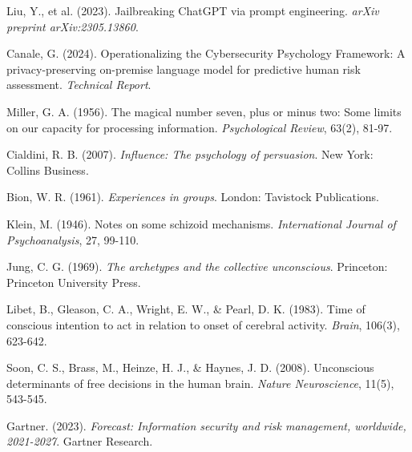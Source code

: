 \documentclass[11pt, a4paper]{article}
\begin{document}
\begin{thebibliography}{99}
Liu, Y., et al. (2023). Jailbreaking ChatGPT via prompt engineering. \textit{arXiv preprint arXiv:2305.13860}.

Canale, G. (2024). Operationalizing the Cybersecurity Psychology Framework: A privacy-preserving on-premise language model for predictive human risk assessment. \textit{Technical Report}.

Miller, G. A. (1956). The magical number seven, plus or minus two: Some limits on our capacity for processing information. \textit{Psychological Review}, 63(2), 81-97.

Cialdini, R. B. (2007). \textit{Influence: The psychology of persuasion}. New York: Collins Business.

Bion, W. R. (1961). \textit{Experiences in groups}. London: Tavistock Publications.

Klein, M. (1946). Notes on some schizoid mechanisms. \textit{International Journal of Psychoanalysis}, 27, 99-110.

Jung, C. G. (1969). \textit{The archetypes and the collective unconscious}. Princeton: Princeton University Press.

Libet, B., Gleason, C. A., Wright, E. W., \& Pearl, D. K. (1983). Time of conscious intention to act in relation to onset of cerebral activity. \textit{Brain}, 106(3), 623-642.

Soon, C. S., Brass, M., Heinze, H. J., \& Haynes, J. D. (2008). Unconscious determinants of free decisions in the human brain. \textit{Nature Neuroscience}, 11(5), 543-545.

Gartner. (2023). \textit{Forecast: Information security and risk management, worldwide, 2021-2027}. Gartner Research.

\end{thebibliography}
\end{document}
